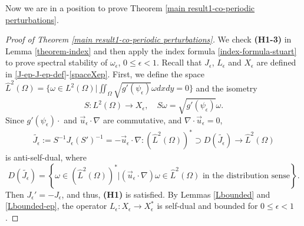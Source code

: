 \documentclass[1 [leqno, 11pt]{amsart}
\numberwithin{equation}{section}
\let\ep=\epsilon
\newtheorem{Theorem}{Theorem}[section]
\begin{document}
\begin{CJK*}{GBK}{song}
Now  we are in a position to prove  Theorem \ref{main result1-co-periodic perturbations}.
 \begin{proof}[Proof of Theorem \ref{main result1-co-periodic perturbations}]
We check \textbf{(H1-3)} in Lemma \ref{theorem-index} and then  apply the index formula \eqref{index-formula-stuart}  to prove  spectral stability of $\omega_\ep$, $0\leq \ep<1$. Recall that $J_\epsilon$, $L_\epsilon$ and $X_\ep$ are defined in \eqref{J-ep-J-ep-def}-\eqref{spaceXep}.
First, we define the space $\hat L^2(\Omega)=\{\omega\in L^2(\Omega)|\iint_\Omega \sqrt{g'(\psi_\ep)}\omega dxdy=0\}$ and the isometry
$$S: L^2(\Omega) \rightarrow X_\ep, \quad S\omega = \sqrt{g'(\psi_\ep)}\omega.$$
 Since $g'(\psi_\ep)\cdot$ and $\vec{u}_\ep \cdot \nabla$ are commutative, and $\nabla \cdot \vec{u}_\ep = 0$,
\begin{align}\label{tilde-J-ep}\tilde{J_\ep} := S^{-1} J_\ep (S')^{-1} = -\vec{u}_\ep \cdot \nabla:(\hat L^2(\Omega))^*\supset D(\tilde{J_\ep}) \rightarrow \hat L^2(\Omega)\end{align}
is anti-self-dual, where
$$D(\tilde{J_\ep}) =  \left\{ \omega \in  (\hat L^2(\Omega))^* | (\vec{u}_\ep \cdot \nabla) \omega \in \hat L^2(\Omega) \text{ in the distribution sense} \right\}.$$
Then $J_\ep' = -J_\ep$, and thus, \textbf{(H1)} is satisfied.
By Lemmas  \ref{Lbounded} and \ref{Lbounded-ep},
 the  operator $L_\ep:X_\ep\to X_\ep^*$ is self-dual and bounded for $0\leq \ep<1$.


\end{proof}
\end{CJK*}
\end{document}
